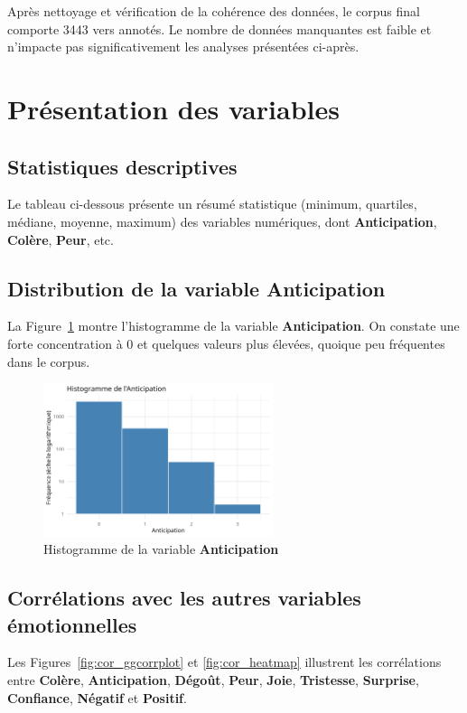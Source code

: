 \documentclass[12pt,a4paper]{article}
\begin{document}
	Après nettoyage et vérification de la cohérence des données, le corpus final comporte 3443
	vers annotés. Le nombre de données manquantes est faible et n’impacte pas significativement
	les analyses présentées ci-après.
	
	\section{Présentation des variables}
	
	\subsection{Statistiques descriptives}
	Le tableau ci-dessous présente un résumé statistique (minimum, quartiles, médiane, moyenne, maximum)
	des variables numériques, dont \textbf{Anticipation}, \textbf{Colère}, \textbf{Peur}, etc.
	
	
	
	\subsection{Distribution de la variable Anticipation}
	La Figure~\ref{fig:hist_anticipation} montre l'histogramme de la variable \textbf{Anticipation}.
	On constate une forte concentration à 0 et quelques valeurs plus élevées, quoique
	peu fréquentes dans le corpus.
	
	\begin{figure}[H]
		\centering
		\includegraphics[width=0.6\textwidth]{figures/hist_anticipation.png}
		\caption{Histogramme de la variable \textbf{Anticipation}}
		\label{fig:hist_anticipation}
	\end{figure}
	
	\subsection{Corrélations avec les autres variables émotionnelles}
	Les Figures~\ref{fig:cor_ggcorrplot} et \ref{fig:cor_heatmap} illustrent les
	corrélations entre \textbf{Colère}, \textbf{Anticipation}, \textbf{Dégoût}, \textbf{Peur},
	\textbf{Joie}, \textbf{Tristesse}, \textbf{Surprise}, \textbf{Confiance}, \textbf{Négatif}
	et \textbf{Positif}.
	
\end{document}
